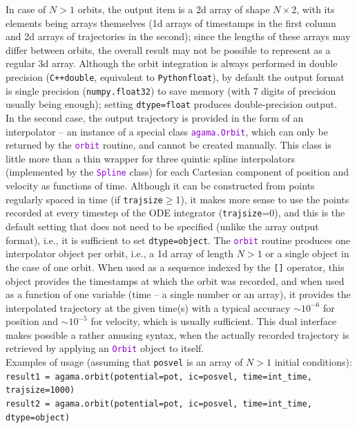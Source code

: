 \documentclass[12pt]{article}
\newcommand{\Cpp}  {\texttt{C++}\xspace}
\newcommand{\Python}{\texttt{Python}\xspace}
\newcommand{\ttt}[1]{\textcolor{darkviolet}{\texttt{#1}}}
\newcommand{\ppp}[1]{\textcolor{darkolive} {\texttt{#1}}}
\begin{document}
In case of $N>1$ orbits, the output item is a 2d array of shape $N\times 2$, with its elements being arrays themselves (1d arrays of timestamps in the first column and 2d arrays of trajectories in the second); since the lengths of these arrays may differ between orbits, the overall result may not be possible to represent as a regular 3d array. Although the orbit integration is always performed in double precision (\Cpp \texttt{double}, equivalent to \Python \texttt{float}), by default the output format is single precision (\texttt{numpy.float32}) to save memory (with 7 digits of precision usually being enough); setting \ppp{dtype}\texttt{=float} produces double-precision output.\\
In the second case, the output trajectory is provided in the form of an interpolator -- an instance of a special class \ttt{agama.Orbit}, which can only be returned by the \ttt{orbit} routine, and cannot be created manually. This class is little more than a thin wrapper for three quintic spline interpolators (implemented by the \ttt{Spline} class) for each Cartesian component of position and velocity as functions of time. Although it can be constructed from points regularly spaced in time (if \ppp{trajsize}$\ge$1), it makes more sense to use the points recorded at every timestep of the ODE integrator (\ppp{trajsize}=0), and this is the default setting that does not need to be specified (unlike the array output format), i.e., it is sufficient to set \ppp{dtype}\texttt{=object}. The \ttt{orbit} routine produces one interpolator object per orbit, i.e., a 1d array of length $N>1$ or a single object in the case of one orbit. When used as a sequence indexed by the \texttt{[]} operator, this object provides the timestamps at which the orbit was recorded, and when used as a function of one variable (time -- a single number or an array), it provides the interpolated trajectory at the given time(s) with a typical accuracy $\sim10^{-6}$ for position and $\sim10^{-5}$ for velocity, which is usually sufficient. This dual interface makes possible a rather amusing syntax, when the actually recorded trajectory is retrieved by applying an \ttt{Orbit} object to itself.\\[1mm]
Examples of usage (assuming that \texttt{posvel} is an array of $N>1$ initial conditions):\\[1mm]
\texttt{result1 = agama.orbit(potential=pot, ic=posvel, time=int_time, trajsize=1000)}\\
\texttt{result2 = agama.orbit(potential=pot, ic=posvel, time=int_time, dtype=object)}\\[1mm]
\end{document}

